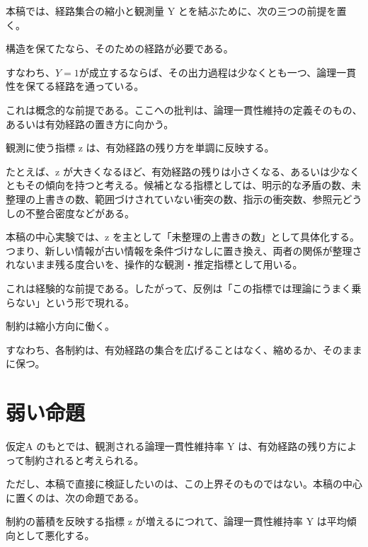 \documentclass[12pt,a4paper]{article}
\begin{document}
本稿では、経路集合の縮小と観測量 Y とを結ぶために、次の三つの前提を置く。

\begin{assumption}[仮定A]
構造を保てたなら、そのための経路が必要である。

すなわち、$Y = 1$が成立するならば、その出力過程は少なくとも一つ、論理一貫性を保てる経路を通っている。

これは概念的な前提である。ここへの批判は、論理一貫性維持の定義そのもの、あるいは有効経路の置き方に向かう。
\end{assumption}

\begin{assumption}[仮定B]
観測に使う指標 z は、有効経路の残り方を単調に反映する。

たとえば、z が大きくなるほど、有効経路の残りは小さくなる、あるいは少なくともその傾向を持つと考える。候補となる指標としては、明示的な矛盾の数、未整理の上書きの数、範囲づけされていない衝突の数、指示の衝突数、参照元どうしの不整合密度などがある。

本稿の中心実験では、z を主として「未整理の上書きの数」として具体化する。つまり、新しい情報が古い情報を条件づけなしに置き換え、両者の関係が整理されないまま残る度合いを、操作的な観測・推定指標として用いる。

これは経験的な前提である。したがって、反例は「この指標では理論にうまく乗らない」という形で現れる。
\end{assumption}

\begin{assumption}[仮定C]
制約は縮小方向に働く。

すなわち、各制約は、有効経路の集合を広げることはなく、縮めるか、そのままに保つ。
\end{assumption}

\section{弱い命題}\label{ux5f31ux3044ux547dux984c}

仮定A のもとでは、観測される論理一貫性維持率 Y は、有効経路の残り方によって制約されると考えられる。

ただし、本稿で直接に検証したいのは、この上界そのものではない。本稿の中心に置くのは、次の命題である。

\begin{proposition}[主たる命題]
制約の蓄積を反映する指標 z が増えるにつれて、論理一貫性維持率 Y は平均傾向として悪化する。
\end{proposition}
\end{document}
